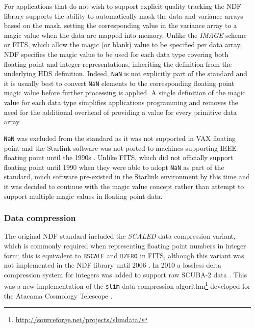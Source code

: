 \documentclass[final,authoryear,5p,times,twocolumn]{elsarticle}
\begin{document}
For applications that do not wish to support explicit quality tracking
the NDF library supports the ability to automatically mask the data
and variance arrays based on the mask, setting the corresponding value
in the variance array to a magic value when the data are mapped into
memory. Unlike the \emph{IMAGE} scheme
or FITS, which allow the magic (or blank) value to be specified per
data array, NDF specifies the magic value to be used for each data type
covering both floating point and integer representations, inheriting
the definition from the underlying HDS definition. Indeed,
\texttt{NaN} is not explicitly part of the standard and it is usually
best to convert \texttt{NaN} elements to the corresponding floating point magic
value before further processing is applied. A single definition of the
magic value for each data type simplifies applications programming and
removes the need for the additional overhead of providing a value for
every primitive data array.

\texttt{NaN} was excluded from the standard as it was not
supported in VAX floating point \citep[see e.g.][]{660194} and the Starlink
software was not ported to machines supporting IEEE floating point
until the 1990s \citep[e.g.,][]{1991STARB...8...11C}. Unlike FITS, which
did not officially support floating point until 1990
\citep{1989FPFITS,1991BAAS...23..993S} when they were able to adopt
\texttt{NaN} as part of the standard, much software pre-existed in the
Starlink environment by this time and it was decided to continue with
the magic value concept rather than attempt to support multiple magic
values in floating point data.

\subsubsection{Data compression}

The original NDF standard included the \emph{SCALED} data compression
variant, which is commonly required when representing floating point numbers in
integer form; this is equivalent to \texttt{BSCALE} and \texttt{BZERO} in
FITS, although this variant was not implemented in the NDF library
until 2006 \citep{2008ASPC..394..650C}. In 2010 a lossless delta
compression system for integers was added to support raw SCUBA-2 data
\citep{2013MNRAS.430.2513H}. This was a new implementation of the
\texttt{slim} data compression
algorithm\footnote{\url{http://sourceforge.net/projects/slimdata/}}
developed for the Atacama Cosmology Telescope
\citep{2004SPIE.5498....1F}.
\end{document}
